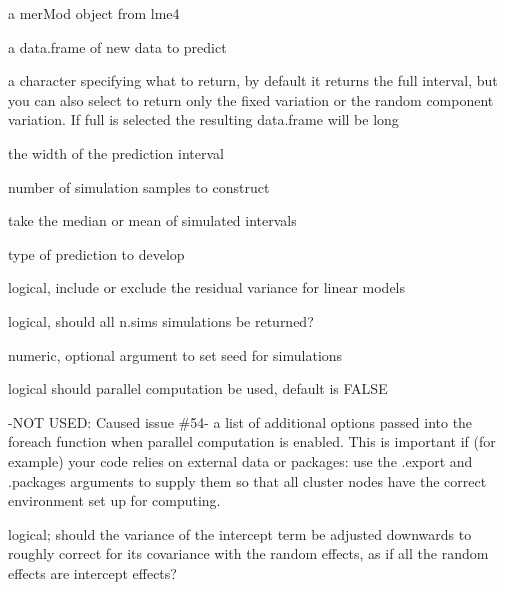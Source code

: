 \documentclass[letterpaper]{book}
\begin{document}
\begin{Arguments}
\begin{ldescription}
\item[\code{merMod}] a merMod object from lme4

\item[\code{newdata}] a data.frame of new data to predict

\item[\code{which}] a character specifying what to return, by default it returns the
full interval, but you can also select to return only the fixed variation or
the random component variation. If full is selected the resulting data.frame
will be  long

\item[\code{level}] the width of the prediction interval

\item[\code{n.sims}] number of simulation samples to construct

\item[\code{stat}] take the median or mean of simulated intervals

\item[\code{type}] type of prediction to develop

\item[\code{include.resid.var}] logical, include or exclude the residual variance for
linear models

\item[\code{returnSims}] logical, should all n.sims simulations be returned?

\item[\code{seed}] numeric, optional argument to set seed for simulations

\item[\code{.parallel, }] logical should parallel computation be used, default is FALSE

\item[\code{.paropts, }] -NOT USED: Caused issue \#54- a list of additional options passed into the foreach function
when parallel computation is enabled. This is important if (for example) your
code relies on external data or packages: use the .export and .packages arguments
to supply them so that all cluster nodes have the correct environment set up
for computing.

\item[\code{fix.intercept.variance}] logical; should the variance of the intercept
term be adjusted downwards to roughly correct for its covariance with the
random effects, as if all the random effects are intercept effects?


\end{ldescription}
\end{Arguments}
\end{document}
